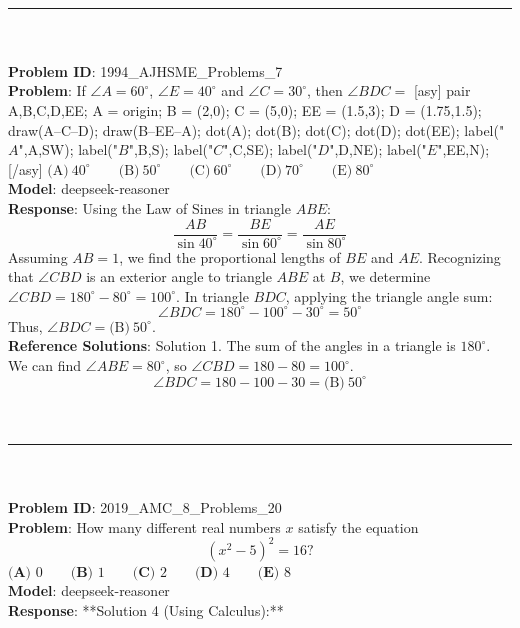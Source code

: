 {    \vspace{0.3cm} \\
    \hrule \\
    \vspace{0.5cm} \\
    \textbf{Problem ID}: 1994_AJHSME_Problems_7 \\
    \textbf{Problem}: If $\angle A = 60^\circ$, $\angle E = 40^\circ$ and $\angle C = 30^\circ$, then $\angle BDC =$
[asy] pair A,B,C,D,EE; A = origin; B = (2,0); C = (5,0); EE = (1.5,3); D = (1.75,1.5); draw(A--C--D); draw(B--EE--A); dot(A); dot(B); dot(C); dot(D); dot(EE); label("$A$",A,SW); label("$B$",B,S); label("$C$",C,SE); label("$D$",D,NE); label("$E$",EE,N); [/asy]
$\text{(A)}\ 40^\circ \qquad \text{(B)}\ 50^\circ \qquad \text{(C)}\ 60^\circ \qquad \text{(D)}\ 70^\circ \qquad \text{(E)}\ 80^\circ$ \\
    \textbf{Model}: deepseek-reasoner \\
    \textbf{Response}: Using the Law of Sines in triangle \(ABE\):
\[
\frac{AB}{\sin 40^\circ} = \frac{BE}{\sin 60^\circ} = \frac{AE}{\sin 80^\circ}
\]
Assuming \(AB = 1\), we find the proportional lengths of \(BE\) and \(AE\). Recognizing that \(\angle CBD\) is an exterior angle to triangle \(ABE\) at \(B\), we determine \(\angle CBD = 180^\circ - 80^\circ = 100^\circ\). In triangle \(BDC\), applying the triangle angle sum:
\[
\angle BDC = 180^\circ - 100^\circ - 30^\circ = 50^\circ
\]
Thus, \(\angle BDC = \boxed{\text{(B)}\ 50^\circ}\). \\
    \textbf{Reference Solutions}: Solution 1. The sum of the angles in a triangle is $180^\circ$. We can find $\angle ABE = 80^\circ$, so $\angle CBD = 180-80=100^\circ$.
\[\angle BDC = 180-100-30=\boxed{\text{(B)}\ 50^\circ}\] \\
    \vspace{0.3cm} \\
    \hrule \\
    \vspace{0.5cm} \\
    \textbf{Problem ID}: 2019_AMC_8_Problems_20 \\
    \textbf{Problem}: How many different real numbers $x$ satisfy the equation \[(x^{2}-5)^{2}=16?\]
$\textbf{(A) }0\qquad\textbf{(B) }1\qquad\textbf{(C) }2\qquad\textbf{(D) }4\qquad\textbf{(E) }8$ \\
    \textbf{Model}: deepseek-reasoner \\
    \textbf{Response}: **Solution 4 (Using Calculus):**

}
